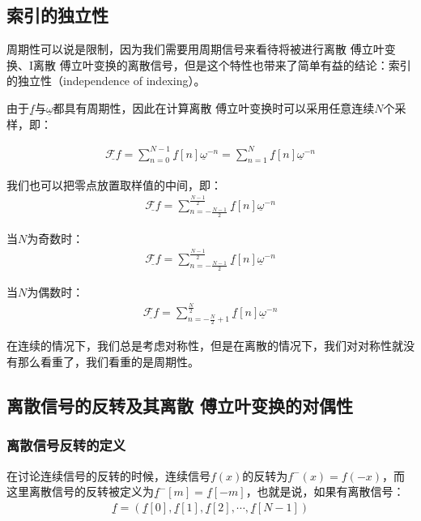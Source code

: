 
\subsection{索引的独立性}
周期性可以说是限制，因为我们需要用周期信号来看待将被进行离散 傅立叶变换、I离散 傅立叶变换的离散信号，但是这个特性也带来了简单有益的结论：索引的独立性（independence of indexing）。

由于$\underline{f}$与$\underline{\omega}$都具有周期性，因此在计算离散 傅立叶变换时可以采用任意连续$N$个采样，即：

\begin{align*}
	\underline{\mathcal{F}f} =  \sum_{n=0}^{N-1}\underline{f}[n]\underline{\omega}^{-n} = \sum_{n=1}^{N}\underline{f}[n]\underline{\omega}^{-n}
\end{align*}

我们也可以把零点放置取样值的中间，即：
\begin{align*}
	\underline{\mathcal{F}f} =  \sum_{n=-\frac{N-1}{2}}^{\frac{N-1}{2}}\underline{f}[n]\underline{\omega}^{-n}
\end{align*}

当$N$为奇数时：
\begin{align*}
	\underline{\mathcal{F}f} = \sum_{n=-\frac{N-1}{2}}^{\frac{N-1}{2}}\underline{f}[n]\underline{\omega}^{-n}
\end{align*}

当$N$为偶数时：
\begin{align*}
	\underline{\mathcal{F}f} =  \sum_{n=-\frac{N}{2}+1}^{\frac{N}{2}}\underline{f}[n]\underline{\omega}^{-n}
\end{align*}

在连续的情况下，我们总是考虑对称性，但是在离散的情况下，我们对对称性就没有那么看重了，我们看重的是周期性。
\subsection{离散信号的反转及其离散 傅立叶变换的对偶性}
\subsubsection{离散信号反转的定义}
在讨论连续信号的反转的时候，连续信号$f(x)$的反转为$f^-(x) = f(-x)$，而这里离散信号的反转被定义为$\underline{f}^{-}[m] = \underline{f}[-m]$，也就是说，如果有离散信号：
\begin{align*}
	\underline{f} = \left(\underline{f}[0],\underline{f}[1],\underline{f}[2],\cdots,\underline{f}[N-1] \right)
\end{align*}

